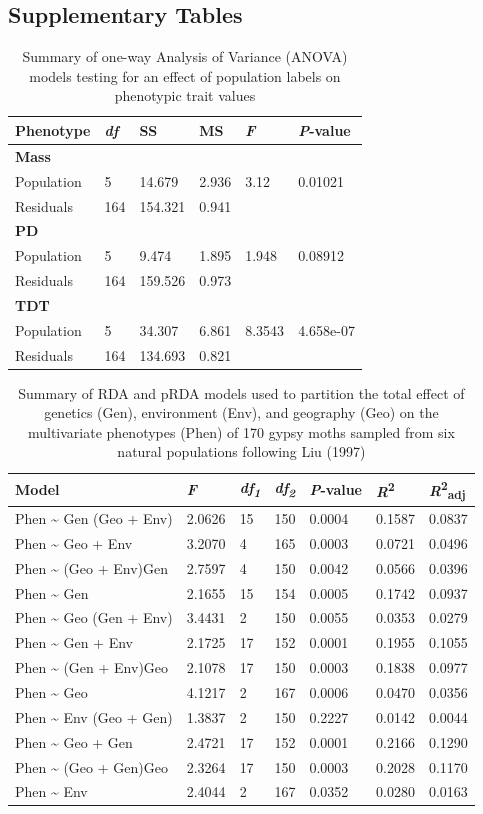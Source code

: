 \documentclass[smallextended]{svjour3}
\begin{document}
\newpage

\subsection*{Supplementary Tables}\label{ss:stab}

\begin{longtable}[c]{@{}llllll@{}}
\caption{Summary of one-way Analysis of Variance (ANOVA)
models testing for an effect of population labels on phenotypic trait
values}\\
\toprule
Phenotype & \emph{df} & SS & MS & \emph{F} &
\emph{P}-value\tabularnewline
\midrule
\endhead
\textbf{Mass} & & & & &\tabularnewline
Population & 5 & 14.679 & 2.936 & 3.12 & 0.01021\tabularnewline
Residuals & 164 & 154.321 & 0.941 & &\tabularnewline
\textbf{PD} & & & & &\tabularnewline
Population & 5 & 9.474 & 1.895 & 1.948 & 0.08912\tabularnewline
Residuals & 164 & 159.526 & 0.973 & &\tabularnewline
\textbf{TDT} & & & & &\tabularnewline
Population & 5 & 34.307 & 6.861 & 8.3543 & 4.658e-07\tabularnewline
Residuals & 164 & 134.693 & 0.821 & &\tabularnewline
\bottomrule
\end{longtable}

\begin{longtable}[c]{@{}lllllll@{}}
\caption{Summary of RDA and pRDA models used to partition the
total effect of genetics (Gen), environment (Env), and geography (Geo)
on the multivariate phenotypes (Phen) of 170 gypsy moths sampled from
six natural populations following Liu (1997)}\\
\toprule
Model & \emph{F} & \emph{df\textsubscript{1}} &
\emph{df\textsubscript{2}} & \emph{P}-value &
\emph{R}\textsuperscript{2} &
\emph{R}\textsuperscript{2}\textsubscript{adj}\tabularnewline%
\midrule
\endhead%
Phen \textasciitilde{} Gen\textbar{} (Geo + Env) & 2.0626 & 15 & 150 &
0.0004 & 0.1587 & 0.0837\tabularnewline%
Phen \textasciitilde{} Geo + Env & 3.2070 & 4 & 165 & 0.0003 & 0.0721 &
0.0496\tabularnewline%
Phen \textasciitilde{} (Geo + Env)\textbar{}Gen & 2.7597 & 4 & 150 &
0.0042 & 0.0566 & 0.0396\tabularnewline%
Phen \textasciitilde{} Gen & 2.1655 & 15 & 154 & 0.0005 & 0.1742 &
0.0937\tabularnewline%
Phen \textasciitilde{} Geo\textbar{} (Gen + Env) & 3.4431 & 2 & 150 &
0.0055 & 0.0353 & 0.0279\tabularnewline%
Phen \textasciitilde{} Gen + Env & 2.1725 & 17 & 152 & 0.0001 & 0.1955 &
0.1055\tabularnewline%
Phen \textasciitilde{} (Gen + Env)\textbar{}Geo & 2.1078 & 17 & 150 &
0.0003 & 0.1838 & 0.0977\tabularnewline%
Phen \textasciitilde{} Geo & 4.1217 & 2 & 167 & 0.0006 & 0.0470 &
0.0356\tabularnewline%
Phen \textasciitilde{} Env\textbar{} (Geo + Gen) & 1.3837 & 2 & 150 &
0.2227 & 0.0142 & 0.0044\tabularnewline%
Phen \textasciitilde{} Geo + Gen & 2.4721 & 17 & 152 & 0.0001 & 0.2166 &
0.1290\tabularnewline%
Phen \textasciitilde{} (Geo + Gen)\textbar{}Geo & 2.3264 & 17 & 150 &
0.0003 & 0.2028 & 0.1170\tabularnewline%
Phen \textasciitilde{} Env & 2.4044 & 2 & 167 & 0.0352 & 0.0280 &
0.0163\tabularnewline%
\bottomrule
\end{longtable}
\end{document}
